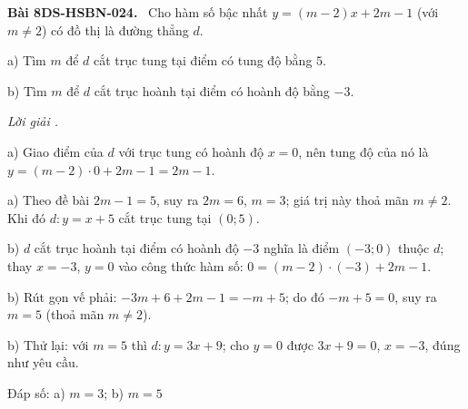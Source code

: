 \documentclass[12pt,a4paper]{article}
\newenvironment{problem}[1][]{\par\medskip\noindent\textbf{Bài #1.}\ }{\par}
\newenvironment{solution}[1][]{\par\noindent\textit{Lời giải #1.}\par}{\par}
\begin{document}
\begin{problem}[8DS-HSBN-024]
Cho hàm số bậc nhất $y = (m - 2)x + 2m - 1$ (với $m \neq 2$) có đồ thị là đường thẳng $d$.

a) Tìm $m$ để $d$ cắt trục tung tại điểm có tung độ bằng $5$.

b) Tìm $m$ để $d$ cắt trục hoành tại điểm có hoành độ bằng $-3$.

\begin{solution}
a) Giao điểm của $d$ với trục tung có hoành độ $x = 0$, nên tung độ của nó là $y = (m - 2) \cdot 0 + 2m - 1 = 2m - 1$.

a) Theo đề bài $2m - 1 = 5$, suy ra $2m = 6$, $m = 3$; giá trị này thoả mãn $m \neq 2$. Khi đó $d\colon y = x + 5$ cắt trục tung tại $(0; 5)$.

b) $d$ cắt trục hoành tại điểm có hoành độ $-3$ nghĩa là điểm $(-3; 0)$ thuộc $d$; thay $x = -3$, $y = 0$ vào công thức hàm số: $0 = (m - 2) \cdot (-3) + 2m - 1$.

b) Rút gọn vế phải: $-3m + 6 + 2m - 1 = -m + 5$; do đó $-m + 5 = 0$, suy ra $m = 5$ (thoả mãn $m \neq 2$).

b) Thử lại: với $m = 5$ thì $d\colon y = 3x + 9$; cho $y = 0$ được $3x + 9 = 0$, $x = -3$, đúng như yêu cầu.

Đáp số: a) $\boxed{m = 3}$; b) $\boxed{m = 5}$
\end{solution}
\end{problem}
\end{document}
